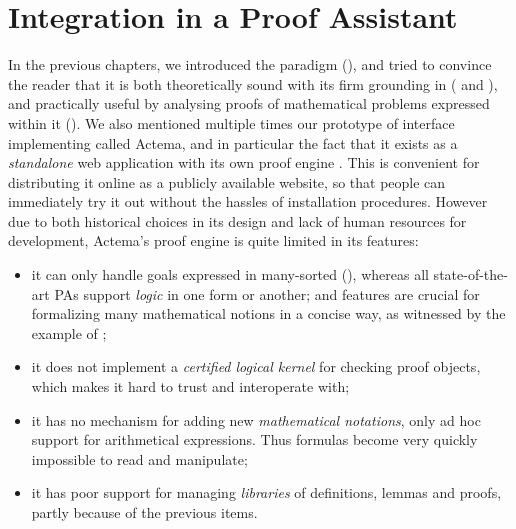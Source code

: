 \setchapterpreamble[u]{\margintoc}
\chapter{Integration in a Proof Assistant}

In the previous chapters, we introduced the  paradigm
(), and tried to convince the reader that it is both theoretically
sound with its firm grounding in   ( and
), and practically useful by analysing proofs of
mathematical problems expressed within it (). We also mentioned
multiple times our prototype of interface implementing  called
Actema, and in particular the fact that it exists as a \emph{standalone} web
application with its own proof engine . This is
convenient for distributing it online as a publicly available website, so that
people can immediately try it out without the hassles of installation
procedures. However due to both historical choices in its design and lack of
human resources for development, Actema's proof engine is quite limited in its
features:
\begin{itemize}
  \item it can only handle goals expressed in many-sorted 
     (), whereas all state-of-the-art PAs support
    \emph{ logic} in one form or another; and  features
    are crucial for formalizing many mathematical notions in a concise way, as
    witnessed by the example of ;
  \item it does not implement a \emph{certified logical kernel} for checking proof
    objects, which makes it hard to trust and interoperate with;
  \item it has no mechanism for adding new \emph{mathematical notations}, only
    ad hoc support for arithmetical expressions. Thus formulas become very
    quickly impossible to read and manipulate;
  \item it has poor support for managing \emph{libraries} of definitions, lemmas
    and proofs, partly because of the previous items.
\end{itemize}

